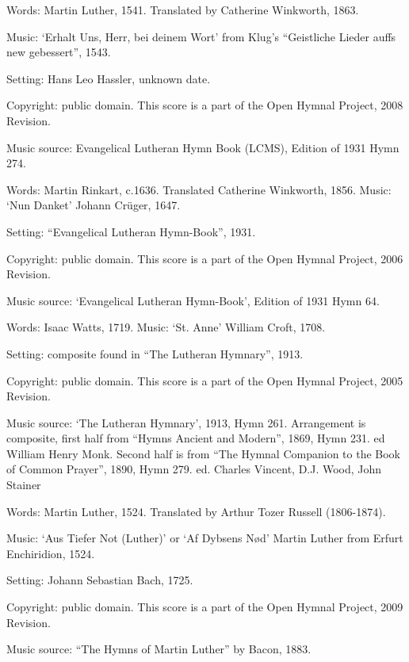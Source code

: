 \begin{multicols}{2}
\par\noindent
Words: Martin Luther, 1541.  Translated by Catherine Winkworth, 1863. 
\par\noindent
Music: `Erhalt Uns, Herr, bei deinem Wort' from Klug's ``Geistliche Lieder auffs new gebessert'', 1543. 
\par\noindent
Setting: Hans Leo Hassler, unknown date.
\par\noindent
Copyright: public domain. This score is a part of the Open Hymnal Project, 2008 Revision.
\par\noindent
Music source: Evangelical Lutheran Hymn Book (LCMS), Edition of 1931 Hymn 274.

\par\noindent
Words: Martin Rinkart, c.1636. Translated Catherine Winkworth, 1856.  Music: `Nun Danket' Johann Crüger, 1647. 
\par\noindent
Setting: ``Evangelical Lutheran Hymn-Book'', 1931.
\par\noindent
Copyright: public domain. This score is a part of the Open Hymnal Project, 2006 Revision.
\par\noindent
Music source: `Evangelical Lutheran Hymn-Book', Edition of 1931 Hymn 64.

\par\noindent
Words: Isaac Watts, 1719.  Music: `St. Anne' William Croft, 1708.
\par\noindent
Setting: composite found in ``The Lutheran Hymnary'', 1913.
\par\noindent
Copyright: public domain. This score is a part of the Open Hymnal Project, 2005 Revision.
\par\noindent
Music source: `The Lutheran Hymnary', 1913, Hymn 261. Arrangement is composite, first half from ``Hymns Ancient and Modern'', 1869, Hymn 231. ed  William Henry Monk. Second half is from ``The Hymnal Companion to the Book of Common Prayer'', 1890, Hymn 279. ed. Charles Vincent, D.J. Wood, John Stainer

\par\noindent
Words: Martin Luther, 1524. Translated by Arthur Tozer Russell (1806-1874). 
\par\noindent
Music: `Aus Tiefer Not (Luther)' or `Af Dybsens Nød' Martin Luther from Erfurt Enchiridion, 1524. 
\par\noindent
Setting: Johann Sebastian Bach, 1725.
\par\noindent
Copyright: public domain. This score is a part of the Open Hymnal Project, 2009 Revision.
\par\noindent
Music source: ``The Hymns of Martin Luther'' by Bacon, 1883.


\end{multicols}
